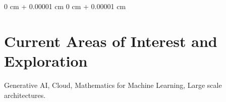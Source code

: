 \documentclass[10pt, letterpaper]{article}
\newenvironment{onecolentry}{
    \begin{adjustwidth}{
        0 cm + 0.00001 cm
    }{
        0 cm + 0.00001 cm
    }
}{
    \end{adjustwidth}
} %
\begin{document}
        \begin{onecolentry}
        \section{Current Areas of Interest and Exploration}
        \vspace{0.10 cm}
        Generative AI, Cloud, Mathematics for Machine Learning, Large scale architectures.
        \end{onecolentry}
\end{document}
